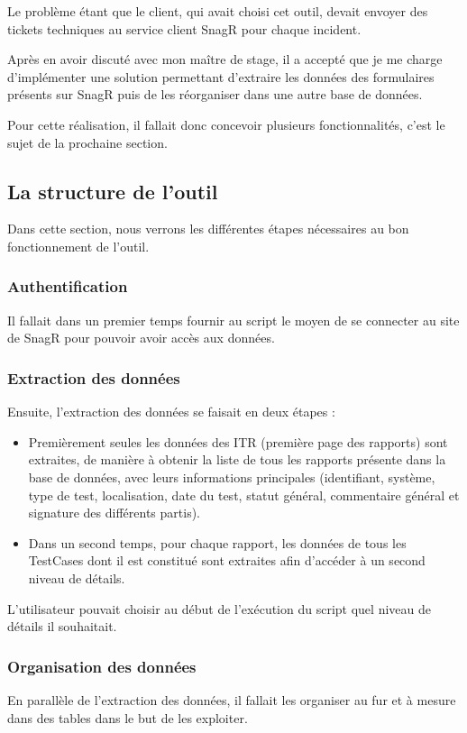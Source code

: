 Le problème étant que le client, qui avait choisi cet outil, devait envoyer des tickets techniques au service client \gls{SnagR} pour chaque incident.

Après en avoir discuté avec mon maître de stage, il a accepté que je me charge d'implémenter une solution permettant d'extraire les données des formulaires présents sur \gls{SnagR} puis de les réorganiser dans une autre base de données.

Pour cette réalisation, il fallait donc concevoir plusieurs fonctionnalités, c'est le sujet de la prochaine section.

\subsection{La structure de l'outil}

Dans cette section, nous verrons les différentes étapes nécessaires au bon fonctionnement de l'outil.

\subsubsection{Authentification}
Il fallait dans un premier temps fournir au script le moyen de se connecter au site de \gls{SnagR} pour pouvoir avoir accès aux données.
\subsubsection{Extraction des données}
Ensuite, l'extraction des données se faisait en deux étapes :
\begin{itemize}
\item Premièrement seules les données des ITR (première page des rapports) sont extraites, de manière à obtenir la liste de tous les rapports présente dans la base de données, avec leurs informations principales (identifiant, système, type de test, localisation, date du test, statut général, commentaire général et signature des différents partis).
\item Dans un second temps, pour chaque rapport, les données de tous les \gls{TestCases} dont il est constitué sont extraites afin d'accéder à un second niveau de détails.
\end{itemize}

L'utilisateur pouvait choisir au début de l'exécution du script quel niveau de détails il souhaitait.
\subsubsection{Organisation des données}
En parallèle de l'extraction des données, il fallait les organiser au fur et à mesure dans des tables dans le but de les exploiter.
